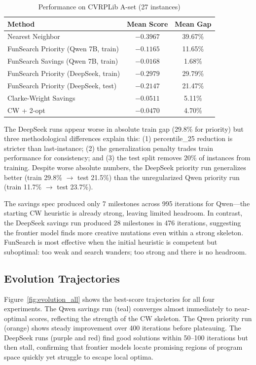 \documentclass{article}
\begin{document}
\begin{table}[h]
\centering
\small
\caption{Performance on CVRPLib A-set (27 instances)}
\label{tab:overall}
\vspace{-4pt}
\begin{tabular}{lcc}
\toprule
Method & Mean Score & Mean Gap \\
\midrule
Nearest Neighbor & $-0.3967$ & 39.67\% \\
FunSearch Priority (Qwen 7B, train) & $-0.1165$ & 11.65\% \\
FunSearch Savings (Qwen 7B, train) & $-0.0168$ & 1.68\% \\
FunSearch Priority (DeepSeek, train) & $-0.2979$ & 29.79\% \\
FunSearch Priority (DeepSeek, test) & $-0.2147$ & 21.47\% \\
Clarke-Wright Savings & $-0.0511$ & 5.11\% \\
CW + 2-opt & $-0.0470$ & 4.70\% \\
\bottomrule
\end{tabular}
\vspace{-8pt}
\end{table}

The DeepSeek runs appear worse in absolute train gap (29.8\% for priority) but three methodological differences explain this: (1) percentile\_25 reduction is stricter than last-instance; (2) the generalization penalty trades train performance for consistency; and (3) the test split removes 20\% of instances from training. Despite worse absolute numbers, the DeepSeek priority run generalizes better (train 29.8\% $\to$ test 21.5\%) than the unregularized Qwen priority run (train 11.7\% $\to$ test 23.7\%).

The savings spec produced only 7 milestones across 995 iterations for Qwen---the starting CW heuristic is already strong, leaving limited headroom. In contrast, the DeepSeek savings run produced 28 milestones in 476 iterations, suggesting the frontier model finds more creative mutations even within a strong skeleton. FunSearch is most effective when the initial heuristic is competent but suboptimal: too weak and search wanders; too strong and there is no headroom.

\subsection{Evolution Trajectories}
\vspace{-2pt}

Figure~\ref{fig:evolution_all} shows the best-score trajectories for all four experiments. The Qwen savings run (teal) converges almost immediately to near-optimal scores, reflecting the strength of the CW skeleton. The Qwen priority run (orange) shows steady improvement over 400 iterations before plateauing. The DeepSeek runs (purple and red) find good solutions within 50--100 iterations but then stall, confirming that frontier models locate promising regions of program space quickly yet struggle to escape local optima.
\end{document}
